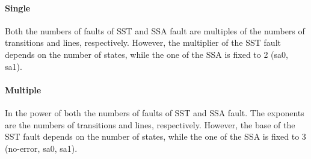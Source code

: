\paragraph{Single}
Both the numbers of faults of SST and SSA fault are multiples of the numbers of transitions and lines, respectively. However, the multiplier of the SST fault depends on the number of states, while the one of the SSA is fixed to 2 (sa0, sa1).
\paragraph{Multiple}
In the power of both the numbers of faults of SST and SSA fault. The exponents are the numbers of transitions and lines, respectively. However, the base of the SST fault depends on the number of states, while the one of the SSA is fixed to 3 (no-error, sa0, sa1).
